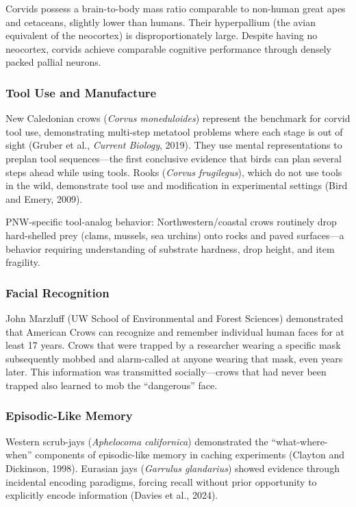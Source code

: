 \documentclass[11pt,letterpaper]{article}
\begin{document}
Corvids possess a brain-to-body mass ratio comparable to non-human great apes and cetaceans, slightly lower than humans. Their hyperpallium (the avian equivalent of the neocortex) is disproportionately large. Despite having no neocortex, corvids achieve comparable cognitive performance through densely packed pallial neurons.

\subsubsection{Tool Use and Manufacture}

New Caledonian crows (\textit{Corvus moneduloides}) represent the benchmark for corvid tool use, demonstrating multi-step metatool problems where each stage is out of sight (Gruber et al., \textit{Current Biology}, 2019). They use mental representations to preplan tool sequences---the first conclusive evidence that birds can plan several steps ahead while using tools. Rooks (\textit{Corvus frugilegus}), which do not use tools in the wild, demonstrate tool use and modification in experimental settings (Bird and Emery, 2009).

PNW-specific tool-analog behavior: Northwestern/coastal crows routinely drop hard-shelled prey (clams, mussels, sea urchins) onto rocks and paved surfaces---a behavior requiring understanding of substrate hardness, drop height, and item fragility.

\subsubsection{Facial Recognition}

John Marzluff (UW School of Environmental and Forest Sciences) demonstrated that American Crows can recognize and remember individual human faces for at least 17 years. Crows that were trapped by a researcher wearing a specific mask subsequently mobbed and alarm-called at anyone wearing that mask, even years later. This information was transmitted socially---crows that had never been trapped also learned to mob the ``dangerous'' face.

\subsubsection{Episodic-Like Memory}

Western scrub-jays (\textit{Aphelocoma californica}) demonstrated the ``what-where-when'' components of episodic-like memory in caching experiments (Clayton and Dickinson, 1998). Eurasian jays (\textit{Garrulus glandarius}) showed evidence through incidental encoding paradigms, forcing recall without prior opportunity to explicitly encode information (Davies et al., 2024).
\end{document}
